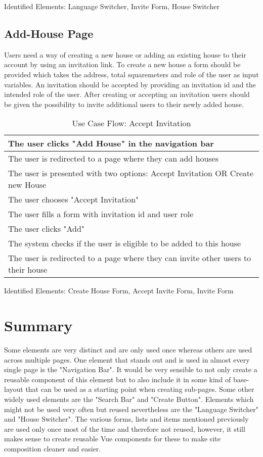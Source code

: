 Identified Elements: Language Switcher, Invite Form, House Switcher

\subsection{Add-House Page}
Users need a way of creating a new house or adding an existing house to their account by using an invitation link. To create a new house a form should be provided which takes the address, total squaremeters and role of the user as input variables. An invitation should be accepted by providing an invitation id and the intended role of the user. After creating or accepting an invitation users should be given the possibility to invite additional users to their newly added house. \newline

\begin{table}[H]
\begin{tabularx}{\linewidth}{|X|}
  \hline
   The user clicks "Add House" in the navigation bar \\
   \hline
   The user is redirected to a page where they can add houses \\
   \hline
   The user is presented with two options: Accept Invitation OR Create new House \\
   \hline 
   The user chooses "Accept Invitation" \\
   \hline 
   The user fills a form with invitation id and user role \\
   \hline
   The user clicks "Add" \\
   \hline  
   The system checks if the user is eligible to be added to this house \\
   \hline  
   The user is redirected to a page where they can invite other users to their house \\
   \hline  
\end{tabularx}
\caption{Use Case Flow: Accept Invitation}
\end{table}

Identified Elements: Create House Form, Accept Invite Form, Invite Form

\section{Summary}
Some elements are very distinct and are only used once whereas others are used across multiple pages. One element that stands out and is used in almost every single page is the "Navigation Bar". It would be very sensible to not only create a reusable component of this element but to also include it in some kind of base-layout that can be used as a starting point when creating sub-pages. Some other widely used elements are the "Search Bar" and "Create Button". Elements which might not be used very often but reused nevertheless are the "Language Switcher" and "House Switcher". The various forms, lists and items mentioned previously are used only once most of the time and therefore not reused, however, it still makes sense to create reusable Vue components for these to make site composition cleaner and easier.

